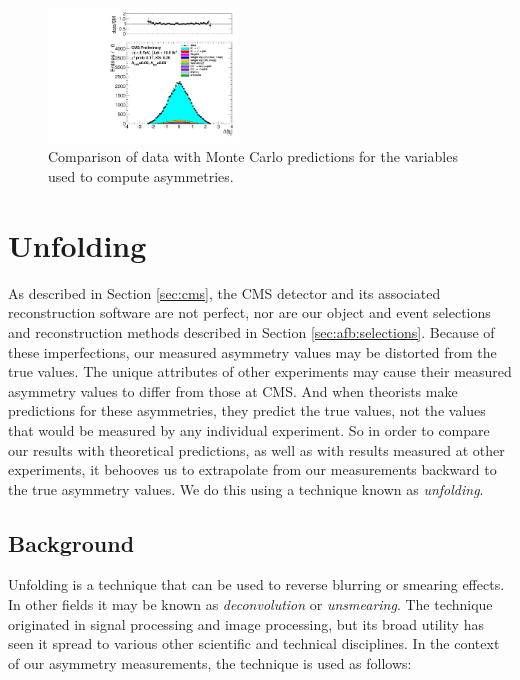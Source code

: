 \begin{figure}[phtb]
  \includegraphics[width=0.45\textwidth]{figures/dataMC_lep_charge_asymmetry_combined.pdf}
  \caption{Comparison of data with Monte Carlo predictions for the
    variables used to compute asymmetries.}
  \label{fig:afb:datamcasymvars}
\end{figure}

\section{Unfolding}
\label{sec:afb:unfolding}

As described in Section \ref{sec:cms}, the CMS detector and its
associated reconstruction software are not perfect, nor are our object
and event selections and reconstruction methods described in Section
\ref{sec:afb:selections}. Because of these imperfections, our measured
asymmetry values may be distorted from the true values.
The unique attributes of other experiments may cause their measured
asymmetry values to differ from those at CMS. And
when theorists make predictions for these asymmetries,
they predict the true values, not the values that would be measured by any
individual experiment. So in order to compare our results with
theoretical predictions, as well as with results measured at other
experiments, it behooves us to extrapolate from our measurements
backward to the true asymmetry values. We do this using a
technique known as \emph{unfolding}.

\subsection{Background}
\label{ssec:afb:unfoldingbkg}

Unfolding is a technique that can be used to reverse blurring or
smearing effects. In other fields it may be known as
\emph{deconvolution} or \emph{unsmearing}. The technique originated in
signal processing and image processing, but its broad utility has seen
it spread to various other scientific and technical disciplines. In
the context of our asymmetry measurements, the technique is used as follows: %


